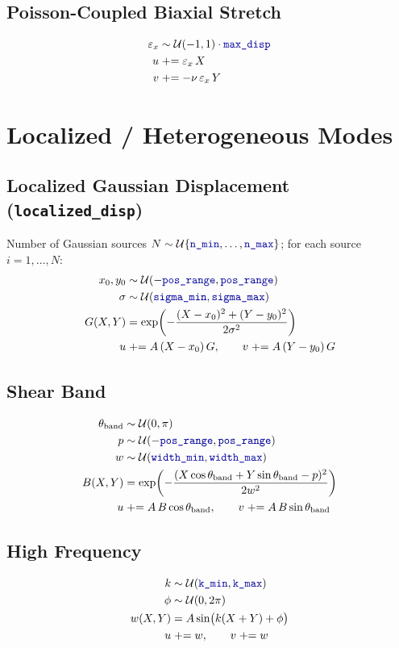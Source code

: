 \documentclass[11pt]{article}
\newcommand{\param}[1]{\texttt{\color{blue!60!black}#1}}
\begin{document}
\subsection{Poisson-Coupled Biaxial Stretch}
\begin{align}
\varepsilon_x &\sim \mathcal{U}(-1,1)\cdot \param{max\_disp} \\
u &\mathrel{+}= \varepsilon_x\,X \\
v &\mathrel{+}= -\nu\,\varepsilon_x\,Y
\end{align}

\section{Localized / Heterogeneous Modes}

\subsection{Localized Gaussian Displacement (\texttt{localized\_disp})}
Number of Gaussian sources $N \sim \mathcal{U}\{\param{n\_min}, \dots, \param{n\_max}\}$;
for each source $i = 1, \dots, N$:
\begin{align}
x_0, y_0 &\sim \mathcal{U}(-\param{pos\_range}, \param{pos\_range}) \\
\sigma &\sim \mathcal{U}(\param{sigma\_min}, \param{sigma\_max}) \\
G(X,Y) &= \exp\!\left(-\frac{(X-x_0)^2 + (Y-y_0)^2}{2\sigma^2}\right) \\
u &\mathrel{+}= A\,(X-x_0)\,G, \qquad v \mathrel{+}= A\,(Y-y_0)\,G
\end{align}

\subsection{Shear Band}
\begin{align}
\theta_{\text{band}} &\sim \mathcal{U}(0, \pi) \\
p &\sim \mathcal{U}(-\param{pos\_range}, \param{pos\_range}) \\
w &\sim \mathcal{U}(\param{width\_min}, \param{width\_max}) \\
B(X,Y) &= \exp\!\left(-\frac{(X\cos\theta_{\text{band}} + Y\sin\theta_{\text{band}} - p)^2}{2w^2}\right) \\
u &\mathrel{+}= A\,B\cos\theta_{\text{band}}, \qquad v \mathrel{+}= A\,B\sin\theta_{\text{band}}
\end{align}

\subsection{High Frequency}
\begin{align}
k &\sim \mathcal{U}(\param{k\_min}, \param{k\_max}) \\
\phi &\sim \mathcal{U}(0, 2\pi) \\
w(X,Y) &= A\sin\!\big(k(X+Y) + \phi\big) \\
u &\mathrel{+}= w, \qquad v \mathrel{+}= w
\end{align}
\end{document}
